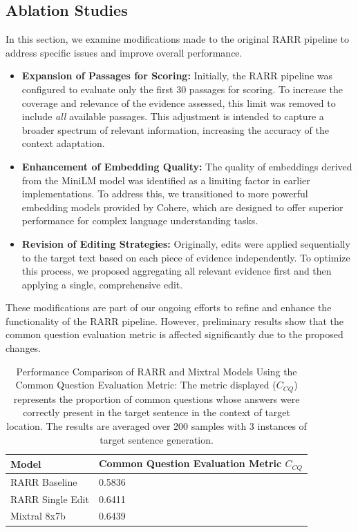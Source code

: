 \documentclass[11pt]{article}
\begin{document}
	\subsection{Ablation Studies}
	
	In this section, we examine modifications made to the original RARR pipeline to address specific issues and improve overall performance. 
	
	\begin{itemize}
		\item \textbf{Expansion of Passages for Scoring:} Initially, the RARR pipeline was configured to evaluate only the first 30 passages for scoring. To increase the coverage and relevance of the evidence assessed, this limit was removed to include \textit{all} available passages. This adjustment is intended to capture a broader spectrum of relevant information, increasing the accuracy of the context adaptation.
		
		\item \textbf{Enhancement of Embedding Quality:} The quality of embeddings derived from the MiniLM model was identified as a limiting factor in earlier implementations. To address this, we transitioned to more powerful embedding models provided by Cohere, which are designed to offer superior performance for complex language understanding tasks.
		
		\item \textbf{Revision of Editing Strategies:} Originally, edits were applied sequentially to the target text based on each piece of evidence independently. To optimize this process, we proposed aggregating all relevant evidence first and then applying a single, comprehensive edit.
	\end{itemize}
	
	These modifications are part of our ongoing efforts to refine and enhance the functionality of the RARR pipeline. However, preliminary results show that the common question evaluation metric is affected significantly due to the proposed changes.
	
	\begin{table}[tbh]
		\centering
		\begin{tabularx}{\textwidth}{XX}
			\hline 
			\textbf{Model} & \textbf{Common Question Evaluation Metric $C_{CQ}$}  \\ \hline
			RARR Baseline & 0.5836 \\
			RARR Single Edit &0.6411 \\
			Mixtral 8x7b & 0.6439 \\
			\hline
		\end{tabularx}
		\caption{Performance Comparison of RARR and Mixtral Models Using the Common Question Evaluation Metric: The metric displayed ($C_{CQ}$) represents the proportion of common questions whose answers were correctly present in the target sentence in the context of target location. The results are averaged over 200 samples with 3 instances of target sentence generation.}
		\label{T: result}
	\end{table}
	
\end{document}
